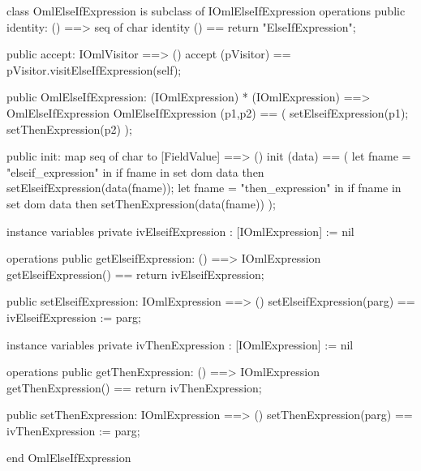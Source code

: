\begin{vdm_al}
class OmlElseIfExpression is subclass of IOmlElseIfExpression
operations
  public identity: () ==> seq of char
  identity () == return "ElseIfExpression";

  public accept: IOmlVisitor ==> ()
  accept (pVisitor) == pVisitor.visitElseIfExpression(self);

  public OmlElseIfExpression:
      (IOmlExpression) *
      (IOmlExpression) ==> OmlElseIfExpression
  OmlElseIfExpression (p1,p2) == 
   ( setElseifExpression(p1);
     setThenExpression(p2) );

  public init: map seq of char to [FieldValue] ==> ()
  init (data) ==
    ( let fname = "elseif_expression" in
        if fname in set dom data
        then setElseifExpression(data(fname));
      let fname = "then_expression" in
        if fname in set dom data
        then setThenExpression(data(fname)) );

instance variables
  private ivElseifExpression : [IOmlExpression] := nil

operations
  public getElseifExpression: () ==> IOmlExpression
  getElseifExpression() == return ivElseifExpression;

  public setElseifExpression: IOmlExpression ==> ()
  setElseifExpression(parg) == ivElseifExpression := parg;

instance variables
  private ivThenExpression : [IOmlExpression] := nil

operations
  public getThenExpression: () ==> IOmlExpression
  getThenExpression() == return ivThenExpression;

  public setThenExpression: IOmlExpression ==> ()
  setThenExpression(parg) == ivThenExpression := parg;

end OmlElseIfExpression
\end{vdm_al}

